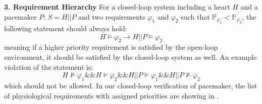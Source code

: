\noindent
\textbf{3. Requirement Hierarchy}
For a closed-loop system including a heart $H$ and a pacemaker $P$: $S=H || P$ and two requirements $\varphi_1$ and $\varphi_2$ such that $\mathbb{P}_{\varphi_1}<\mathbb{P}_{\varphi_2}$, the following statement should always hold:
\vspace{-5pt}
$$H\models\varphi_2\rightarrow H||P\models\varphi_2$$
\noindent
meaning if a higher priority requirement is satisfied by the open-loop environment, it should be satisfied by the closed-loop system as well. An example violation of the statement is:
$$H\not\models\varphi_1 \&\& H\models\varphi_2 \&\& H||P\models\varphi_1 \&\& H||P\not\models\varphi_2$$
\noindent
which should not be allowed. In our closed-loop verification of pacemaker, the list of physiological requirements with assigned priorities are showing in .






